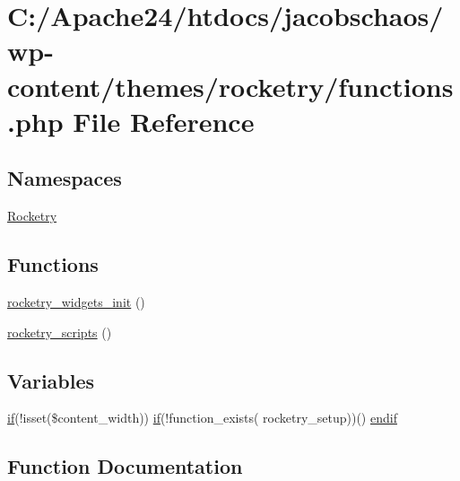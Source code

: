 \hypertarget{functions_8php}{}\section{C\+:/\+Apache24/htdocs/jacobschaos/wp-\/content/themes/rocketry/functions.php File Reference}
\label{functions_8php}
\subsection*{Namespaces}
\begin{DoxyCompactItemize}
\item 
 \hyperlink{namespace_rocketry}{Rocketry}
\end{DoxyCompactItemize}
\subsection*{Functions}
\begin{DoxyCompactItemize}
\item 
\hyperlink{functions_8php_aa1f13be3ee022683445c0c66036ec910}{rocketry\+\_\+widgets\+\_\+init} ()
\item 
\hyperlink{functions_8php_a27ddce0a9bb66c6057d1f135cfb73d6c}{rocketry\+\_\+scripts} ()
\end{DoxyCompactItemize}
\subsection*{Variables}
\begin{DoxyCompactItemize}
\item 
\hyperlink{skip-link-focus-fix_8js_abec33d9ccd80b36e9944d11422db042c}{if}(!isset(\$content\+\_\+width)) \hyperlink{skip-link-focus-fix_8js_abec33d9ccd80b36e9944d11422db042c}{if}(!function\+\_\+exists( \textquotesingle{}rocketry\+\_\+setup\textquotesingle{}))() \hyperlink{functions_8php_ac03a2cf2fcb610cc0b6532716f8e485b}{endif}
\end{DoxyCompactItemize}


\subsection{Function Documentation}
\hypertarget{functions_8php_a27ddce0a9bb66c6057d1f135cfb73d6c}{}
